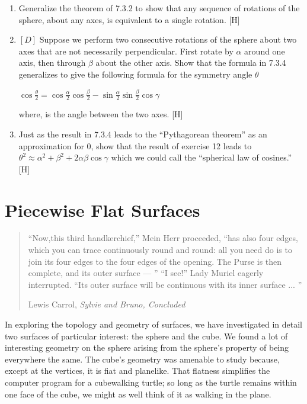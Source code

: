 \documentclass{book}
\begin{document}
\begin{enumerate}
\item Generalize the theorem of 7.3.2 to show that any sequence of
rotations of the sphere, about any axes, is equivalent to a single rotation.
[H]

\item $[D]$ Suppose we perform two consecutive rotations of the sphere
about two axes that are not necessarily perpendicular. First rotate by
$\alpha$ around one axis, then through $\beta$ about the other axis. Show that
the formula in 7.3.4 generalizes to give the following formula for the
symmetry angle $\theta$

$ \cos \frac {\theta} {2} = \cos \frac {\alpha} {2} \cos \frac {\beta} {2} - \sin \frac {\alpha}{2} \sin \frac {\beta}{2} \cos \gamma  $

where, is the angle between the two axes. [H]

\item Just as the result in 7.3.4 leads to the ``Pythagorean theorem'' as an
approximation for 0, show that the result of exercise 12 leads to
$ \theta^2 \approx \alpha^2 + \beta^2 + 2 \alpha \beta \cos \gamma $
which we could call the ``spherical law of cosines.'' [H]
\end{enumerate}


\chapter{Piecewise Flat Surfaces}
\begin{quote}
``Now,this third handkerchief,'' Mein Herr proceeded,
``has also four edges, which you can trace continuously
round and round: all you need do is to join its
four edges to the four edges of the opening. The
Purse is then complete, and its outer surface --- ''
``I see!'' Lady Muriel eagerly interrupted. ``Its
outer surface will be continuous with its inner surface ... ''

Lewis Carrol, {\em Sylvie and Bruno, Concluded}
\end{quote}

In exploring the topology and geometry of surfaces, we have investigated
in detail two surfaces of particular interest: the sphere and the cube.
We found a lot of interesting geometry on the sphere arising from the
sphere's property of being everywhere the same. The cube's geometry
was amenable to study because, except at the vertices, it is fiat and
planelike. That flatness simplifies the computer program for a cubewalking turtle; so long as the turtle remains within one face of the cube,
we might as well think of it as walking in the plane.
\end{document}
